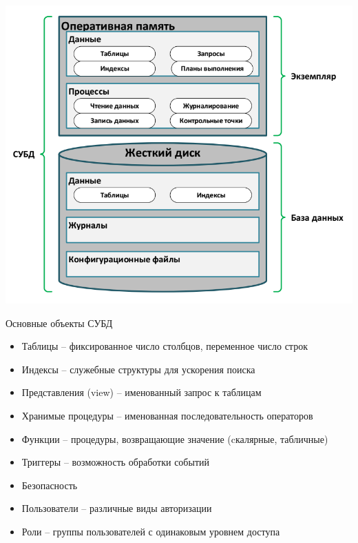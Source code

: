 \documentclass{beamer}
\begin{document}
\begin{frame}
\begin{center}
\includegraphics[scale=0.4]{images/dbms.png}
\end{center}
\end{frame} 

\begin{frame}{Основные объекты СУБД}
\begin{itemize}
\item Таблицы – фиксированное число столбцов, переменное число строк
\item Индексы – служебные структуры для ускорения поиска
\item Представления (view) – именованный запрос к таблицам
\item Хранимые процедуры – именованная последовательность операторов
\item Функции – процедуры, возвращающие значение (cкалярные, табличные)
\item Триггеры – возможность обработки событий
\item Безопасность
\item Пользователи – различные виды авторизации
\item Роли – группы пользователей с одинаковым уровнем доступа
\end{itemize}
\end{frame} 
\end{document}
